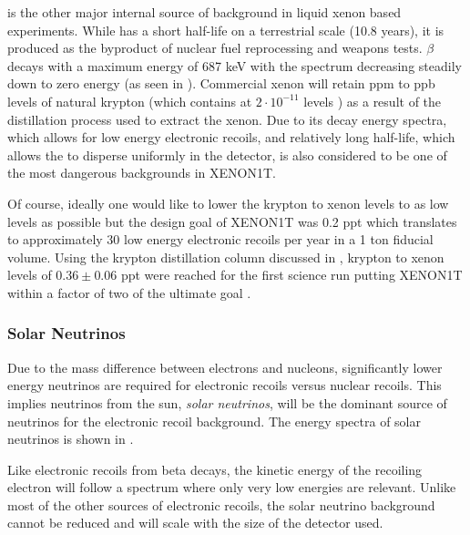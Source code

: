 \krypton{} is the other major internal source of background in liquid xenon based experiments.  While \krypton{} has a short half-life on a terrestrial scale (10.8 years), it is produced as the byproduct of nuclear fuel reprocessing and weapons tests.  \krypton{} $\beta$ decays with a maximum energy of 687 keV with the spectrum decreasing steadily down to zero energy (as seen in ).  Commercial xenon will retain ppm to ppb levels of natural krypton (which contains \krypton{} at $2 \cdot 10^{-11}$ levels \cite{du2004atom}) as a result of the distillation process used to extract the xenon.  Due to its decay energy spectra, which allows for low energy electronic recoils, and relatively long half-life, which allows the \krypton{} to disperse uniformly in the detector, \krypton{} is also considered to be one of the most dangerous backgrounds in XENON1T.  

Of course, ideally one would like to lower the krypton to xenon levels to as low levels as possible but the design goal of XENON1T was 0.2 ppt which translates to approximately 30 low energy electronic recoils per year in a 1 ton fiducial volume.  Using the krypton distillation column discussed in , krypton to xenon levels of $0.36 \pm 0.06$ ppt were reached for the first science run putting XENON1T within a factor of two of the ultimate goal \cite{aprile2017xenon1t}.


\subsubsection{Solar Neutrinos}
\label{sec:xe1t_er_bkg_neutrinos}

Due to the mass difference between electrons and nucleons, significantly lower energy neutrinos are required for electronic recoils versus nuclear recoils.  This implies neutrinos from the sun, \textit{solar neutrinos}, will be the dominant source of neutrinos for the electronic recoil background.  The energy spectra of solar neutrinos is shown in .  

Like electronic recoils from beta decays, the kinetic energy of the recoiling electron will follow a spectrum where only very low energies are relevant.  Unlike most of the other sources of electronic recoils, the solar neutrino background cannot be reduced and will scale with the size of the detector used.


\subsubsection{\radioxenon}

